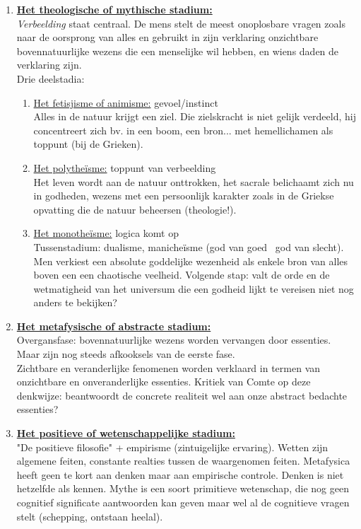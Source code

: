 \begin{enumerate}
\item \underline{\textbf{Het theologische of mythische stadium:}}
\\ \emph{Verbeelding} staat centraal.
De mens stelt de meest onoplosbare vragen zoals naar de oorsprong van alles en gebruikt in zijn verklaring onzichtbare bovennatuurlijke wezens die een menselijke wil hebben, en wiens daden de verklaring zijn.
\\
Drie deelstadia:
\begin{enumerate}
\item \underline{Het fetisjisme of animisme:} gevoel/instinct\\
Alles in de natuur krijgt een ziel. Die zielskracht is niet gelijk verdeeld, hij concentreert zich bv. in een boom, een bron... met hemellichamen als toppunt (bij de Grieken).
\item \underline{Het polythe\"isme:} toppunt van verbeelding \\
Het leven wordt aan de natuur onttrokken, het sacrale belichaamt zich nu in godheden, wezens met een persoonlijk karakter zoals in de Griekse opvatting die de natuur beheersen (theologie!).
\item \underline{Het monothe\"isme:} logica komt op\\
Tussenstadium: dualisme, maniche\"isme (god van goed \ god van slecht). Men verkiest een absolute goddelijke wezenheid als enkele bron van alles boven een een chaotische veelheid.
Volgende stap: valt de orde en de wetmatigheid van het universum die een godheid lijkt te vereisen niet nog anders te bekijken?
\end{enumerate}
\item \underline{\textbf{Het metafysische of abstracte stadium:}}\\
Overgansfase: bovennatuurlijke wezens worden vervangen door essenties. Maar zijn nog steeds afkooksels van de eerste fase.\\
Zichtbare en veranderlijke fenomenen worden verklaard in termen van onzichtbare en onveranderlijke essenties. 
Kritiek van Comte op deze denkwijze: beantwoordt de concrete realiteit wel aan onze abstract bedachte essenties?
\item \underline{\textbf{Het positieve of wetenschappelijke stadium:}}\\
"De positieve filosofie" + empirisme (zintuigelijke ervaring). Wetten zijn algemene feiten, constante realties tussen de waargenomen feiten. Metafysica heeft geen te kort aan denken maar aan empirische controle. Denken is niet hetzelfde als kennen.  Mythe is een soort primitieve wetenschap, die nog geen cognitief significate aantwoorden kan geven maar wel al de cognitieve vragen stelt (schepping, ontstaan heelal).

\end{enumerate}
